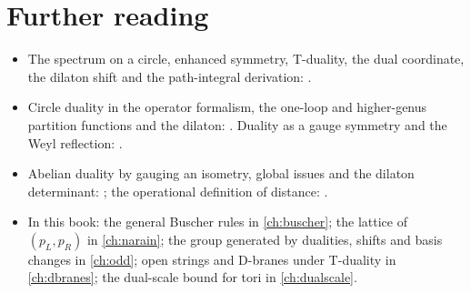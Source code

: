 \section*{Further reading}
\begin{itemize}[leftmargin=*]
\item The spectrum on a circle, enhanced symmetry, T-duality, the dual coordinate, the dilaton
 shift and the path-integral derivation: .
\item Circle duality in the operator formalism, the one-loop and higher-genus partition
 functions and the dilaton: . Duality as a gauge symmetry
 and the Weyl reflection: .
\item Abelian duality by gauging an isometry, global issues and the dilaton determinant:
 ; the operational definition of distance:
 .
\item In this book: the general Buscher rules in \cref{ch:buscher}; the lattice of $(p_L,p_R)$ in
 \cref{ch:narain}; the group generated by dualities, shifts and basis changes in \cref{ch:odd};
 open strings and D-branes under T-duality in \cref{ch:dbranes}; the dual-scale bound for tori in
 \cref{ch:dualscale}.
\end{itemize}
